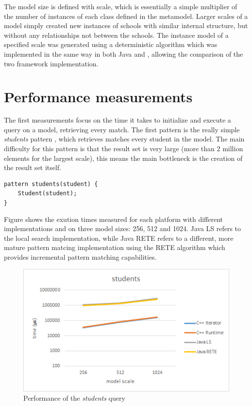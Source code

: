 The model size is defined with scale, which is essentially a simple multiplier
of the number of instances of each class defined in the metamodel. Larger
scales of a model simply created new instances of schools with similar
internal structure, but without any relationships not between the schools. The
instance model of a specified scale was generated using a deterministic
algorithm which was implemented in the same way in both Java and \CPP{},
allowing the comparison of the two framework implementation.

\section{Performance measurements}

The first measurements focus on the time it takes to initialize and execute a
query on a model, retrieving every match. The first pattern is the really simple
\emph{students} pattern , which retrieves matches every
student in the model. The main difficulty for this pattern is that the result
set is very large (more than 2 million elements for the largest scale), this
means the main bottleneck is the creation of the result set itself.

\begin{lstlisting}[frame=single,float=!ht,language=IQPL,
label=listing:meas_students, caption=The students pattern]
pattern students(student) {
	Student(student);
}
\end{lstlisting}

Figure  shows the exution times measured for each platform
with different implementations and on three model sizes: 256, 512 and 1024. Java
LS refers to the local search implementation, while Java RETE refers to a
different, more mature pattern matcing implementation using the RETE algorithm
which provides incremental pattern matching capabilities.

\begin{figure}[!ht]
\centering
\includegraphics[width=120mm, keepaspectratio]{figures/meas_students.png}
\caption{Performance of the \emph{students} query}
\label{fig:meas_students}
\end{figure}

